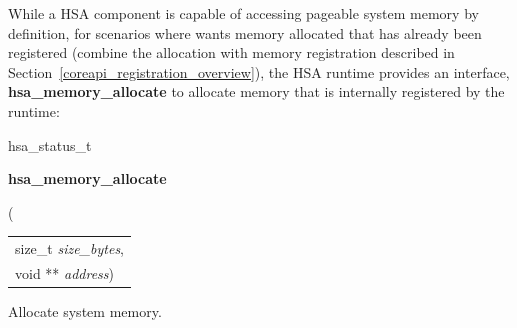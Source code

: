 \documentclass{book}
\newcommand{\hsaarg}[1]{\textit{#1}}
\newcommand{\hsadef}[2]{\hypertarget{#1}{\textbf{#2}}}
\newcommand{\hsatyp}[2]{\hypertarget{#1}{#2}}
\newcommand{\reffun}[1]{\textbf{#1}}
\begin{document}
While a HSA component is capable of accessing pageable system memory
by definition, for scenarios where wants memory allocated that has
already been registered (combine the allocation with memory
registration described in
Section~\ref{coreapi_registration_overview}), the HSA runtime
provides an interface, \reffun{hsa\_memory\_allocate} to allocate
memory that is internally registered by the runtime:

\makeatletter{}

\noindent\begin{tcolorbox}[breakable,nobeforeafter,colframe=white,colback=lightgray,left=0mm]
\hsatyp{group__status_1gad755322e7ff95456520e8abdbe90d225}{hsa\_status\_t} \hsadef{group__memory__allocate_1gae86946629841221ce6ec2819fbad6e80}{hsa\_memory\_allocate}(
\vspace{-3.5mm}\begin{longtable}{@{}p{\textwidth}}
\hspace{1.7em}size\_t \hsaarg{size\_bytes},\\
\hspace{1.7em}void ** \hsaarg{address})\end{longtable}

\end{tcolorbox}
Allocate system memory.
\end{document}
